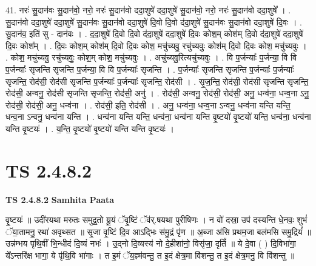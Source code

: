 \documentclass[17pt]{extarticle}
\begin{document}
41. नरः॑ सु॒दान॑वः सु॒दान॑वो॒ नरो॒ नरः॑ सु॒दान॑वो ददा॒शुषे॑ ददा॒शुषे॑ सु॒दान॑वो॒ नरो॒ नरः॑ सु॒दान॑वो ददा॒शुषे᳚ । . सु॒दान॑वो ददा॒शुषे॑ ददा॒शुषे॑ सु॒दान॑वः सु॒दान॑वो ददा॒शुषे॑ दि॒वो दि॒वो द॑दा॒शुषे॑ सु॒दान॑वः सु॒दान॑वो ददा॒शुषे॑ दि॒वः । . सु॒दान॑व॒ इति॑ सु - दान॑वः । . द॒दा॒शुषे॑ दि॒वो दि॒वो द॑दा॒शुषे॑ ददा॒शुषे॑ दि॒वः कोश॒म् कोश॑म् दि॒वो द॑दा॒शुषे॑ ददा॒शुषे॑ दि॒वः कोश᳚म् । . दि॒वः कोश॒म् कोश॑म् दि॒वो दि॒वः कोश॒ मचु॑च्यवु॒ रचु॑च्यवुः॒ कोश॑म् दि॒वो दि॒वः कोश॒ मचु॑च्यवुः । . कोश॒ मचु॑च्यवु॒ रचु॑च्यवुः॒ कोश॒म् कोश॒ मचु॑च्यवुः । . अचु॑च्यवु॒रित्यचु॑च्यवुः । . वि प॒र्जन्याः᳚ प॒र्जन्या॒ वि वि प॒र्जन्याः᳚ सृजन्ति सृजन्ति प॒र्जन्या॒ वि वि प॒र्जन्याः᳚ सृजन्ति । . प॒र्जन्याः᳚ सृजन्ति सृजन्ति प॒र्जन्याः᳚ प॒र्जन्याः᳚ सृजन्ति॒ रोद॑सी॒ रोद॑सी सृजन्ति प॒र्जन्याः᳚ प॒र्जन्याः᳚ सृजन्ति॒ रोद॑सी । . सृ॒ज॒न्ति॒ रोद॑सी॒ रोद॑सी सृजन्ति सृजन्ति॒ रोद॑सी॒ अन्वनु॒ रोद॑सी सृजन्ति सृजन्ति॒ रोद॑सी॒ अनु॑ । . रोद॑सी॒ अन्वनु॒ रोद॑सी॒ रोद॑सी॒ अनु॒ धन्व॑ना॒ धन्व॒ना ऽनु॒ रोद॑सी॒ रोद॑सी॒ अनु॒ धन्व॑ना । . रोद॑सी॒ इति॒ रोद॑सी । . अनु॒ धन्व॑ना॒ धन्व॒ना ऽन्वनु॒ धन्व॑ना यन्ति यन्ति॒ धन्व॒ना ऽन्वनु॒ धन्व॑ना यन्ति । . धन्व॑ना यन्ति यन्ति॒ धन्व॑ना॒ धन्व॑ना यन्ति वृ॒ष्टयो॑ वृ॒ष्टयो॑ यन्ति॒ धन्व॑ना॒ धन्व॑ना यन्ति वृ॒ष्टयः॑ । . य॒न्ति॒ वृ॒ष्टयो॑ वृ॒ष्टयो॑ यन्ति यन्ति वृ॒ष्टयः॑ । \newline
\pagebreak
{}

\section{ TS 2.4.8.2 }

\textbf{TS 2.4.8.2 } \newline
\textbf{Samhita Paata} \newline

वृ॒ष्टयः॑ ॥ उदी॑रयथा मरुतः समुद्र॒तो यू॒यं ॅवृ॒ष्टिं ॅव॑र्.षयथा पुरीषिणः । न वो॑ दस्रा॒ उप॑ दस्यन्ति धे॒नवः॒ शुभं॑ ॅया॒तामनु॒ रथा॑ अवृथ्सत ॥ सृ॒जा वृ॒ष्टिं दि॒व आऽद्भिः स॑मु॒द्रं पृ॑ण ॥ अ॒ब्जा अ॑सि प्रथम॒जा बल॑मसि समु॒द्रियं᳚ ॥ उन्न॑म्भय पृथि॒वीं भि॒न्धीदं दि॒व्यं नभः॑ । उ॒द्नो दि॒व्यस्य॑ नो दे॒हीशा॑नो॒ विसृ॑जा॒ दृतिं᳚ ॥ ये दे॒वा ( ) दि॒विभा॑गा॒ ये᳚ऽन्तरि॑क्ष भागा॒ ये पृ॑थि॒वि भा॑गाः । त इ॒मं ॅय॒ज्ञ्म॑वन्तु॒ त इ॒दं क्षेत्र॒मा वि॑शन्तु॒ त इ॒दं क्षेत्र॒मनु॒ वि वि॑शन्तु ॥ \newline
\end{document}
